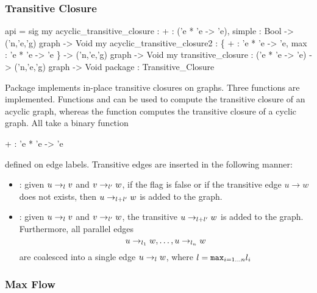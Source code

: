 \subsubsection{Transitive Closure}
\begin{SML}
 api  = sig
    my acyclic_transitive_closure : {  + : ('e * 'e -> 'e), simple : Bool }
        -> ('n,'e,'g) graph -> Void
    my acyclic_transitive_closure2 : 
       \{  + : 'e * 'e -> 'e,
          max : 'e * 'e -> 'e
       \}  -> ('n,'e,'g) graph -> Void
    my transitive_closure : ('e * 'e -> 'e) -> ('n,'e,'g) graph -> Void
 package  : Transitive_Closure
\end{SML}
Package  implements
in-place transitive closures on graphs.   Three functions are implemented.
Functions  and 
 can be used
to compute the transitive closure of an acyclic graph, whereas the
function  computes the transitive closure of
a cyclic graph.  All take a binary function 
\begin{SML}
  + : 'e * 'e -> 'e
\end{SML}
defined on edge labels.  
Transitive edges are inserted in the following manner:

\begin{itemize}
 \item {}:
   given $u \rightarrow_{l} v$ and $v \rightarrow_{l'} w$, 
if the flag  is false or if 
the transitive edge $u \rightarrow w$ does not exists,
then $u \rightarrow_{l + l'} w$ is added to the graph.
 \item {}:
   given $u \rightarrow_{l} v$ and $v \rightarrow_{l'} w$, 
the transitive $u \rightarrow_{l + l'} w$ is added to the graph.
  Furthermore, all parallel edges 
\[ 
   u \rightarrow_{l_1} w, \ldots, u \rightarrow_{l_n} w 
\]
are coalesced into a single edge $u \rightarrow_{l} w$, where 
$l = {\tt max}_{i = 1 \ldots n} l_i$ 
\end{itemize}

\subsubsection{Max Flow}

